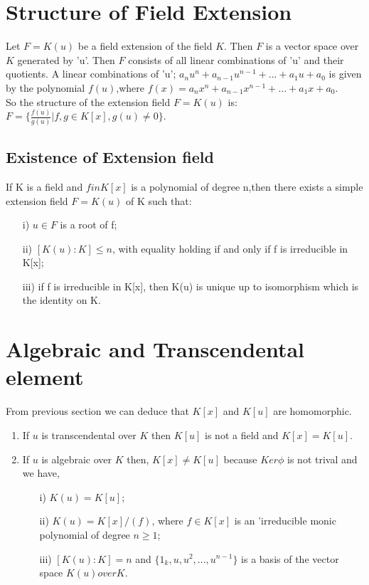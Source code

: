\section{Structure of Field Extension}
Let \(F=K(u)\) be a field extension of the field \(K\). Then \(F\) is a vector space over \(K\) generated by 'u'. Then \(F\) consists of all linear combinations of 'u' and their quotients. A linear combinations of 'u'; \(a_nu^n+a_{n-1}u^{n-1}+...+a_1u+a_0\) is given by the polynomial \(f(u)\),where \(f(x)=a_nx^n+a_{n-1}x^{n-1}+...+a_1x+a_0\).\\

So the structure of the extension field \(F=K(u)\) is:\\
\(F= \{\frac{f(u)}{g(u)}|f,g \in K[x],g(u) \neq 0\}\).


\subsection{Existence of Extension field}

  If K is a field and \(f in K[x]\) is a polynomial of degree n,then there exists a simple extension field \(F=K(u)\) of K such that:\\
  \begin{enumerate}
  \item[i)] \(u \in F\) is a root of f;
  \item[ii)] \([K(u):K] \leq n\), with equality holding if and only if f is irreducible in K[x];
  \item[iii)] if f is irreducible in K[x], then K(u) is unique up to isomorphism which is the identity on K.
  \end{enumerate}

  \section{Algebraic and Transcendental element}
  From previous section we can deduce that \( K[x]\) and \(K[u]\) are homomorphic.\\
  \begin{enumerate}
  \item If \(u\) is transcendental over \(K\) then \(K[u]\) is not a field and \(K[x]=K[u]\).
  \item If \(u\) is algebraic over \(K\) then, \(K[x] \neq K[u]\) because \(Ker\phi\) is not trival and we have,
    \begin{enumerate}
    \item[i)] \(K(u)=K[u]\);
    \item[ii)] \(K(u)=K[x]/(f)\), where \(f \in K[x]\) is an 'irreducible monic polynomial of degree \(n \geq 1\);
    \item[iii)] \([K(u):K]=n\) and \(\{1_k,u,u^2,...,u^{n-1}\}\) is a basis of the vector space \(K(u) over K\).
    \end{enumerate}
  \end{enumerate}







